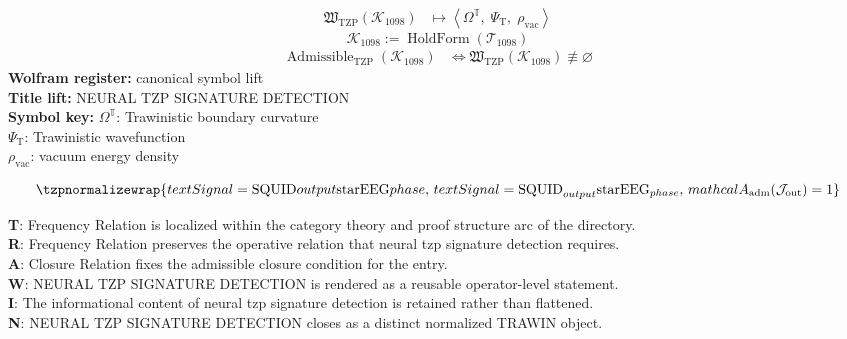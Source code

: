 \noindent
\begin{minipage}[t]{0.48\linewidth}
\begingroup
\small
\[
\begin{aligned}
\mathfrak{W}_{\mathrm{TZP}}\!\left(\mathcal{K}_{1098}\right)
&\longmapsto
\left\langle \Omega^{\mathbb{T}},\; \Psi_{\mathrm{T}},\; \rho_{\mathrm{vac}} \right\rangle
\end{aligned}
\]
\[
\mathcal{K}_{1098}
:=
\operatorname{HoldForm}\!\left(\mathcal{T}_{1098}\right)
\]
\[
\begin{aligned}
\operatorname{Admissible}_{\mathrm{TZP}}\!\left(\mathcal{K}_{1098}\right)
&\Longleftrightarrow
\mathfrak{W}_{\mathrm{TZP}}\!\left(\mathcal{K}_{1098}\right)\not\equiv\varnothing
\end{aligned}
\]
\textbf{Wolfram register:} canonical symbol lift\\
\textbf{Title lift:} NEURAL TZP SIGNATURE DETECTION\\
\textbf{Symbol key:} \(\Omega^{\mathbb{T}}\): Trawinistic boundary curvature\\ \(\Psi_{\mathrm{T}}\): Trawinistic wavefunction\\ \(\rho_{\mathrm{vac}}\): vacuum energy density
\par
\endgroup
\end{minipage}\hfill
\begin{minipage}[t]{0.48\linewidth}
\[
\tzpnormalizewrap{text{Signal} = \text{SQUID} {output} \mathrm{star} \text{EEG} {phase},\,text{Signal} = \text{SQUID}_{output} \mathrm{star} \text{EEG}_{phase},\,mathcal{A}_{\mathrm{adm}}\!\left(\mathcal{J}_{\mathrm{out}}\right)=1}
\]

\small
\textbf{T}: Frequency Relation is localized within the category theory and proof structure arc of the directory.\\
\textbf{R}: Frequency Relation preserves the operative relation that neural tzp signature detection requires.\\
\textbf{A}: Closure Relation fixes the admissible closure condition for the entry.\\
\textbf{W}: NEURAL TZP SIGNATURE DETECTION is rendered as a reusable operator-level statement.\\
\textbf{I}: The informational content of neural tzp signature detection is retained rather than flattened.\\
\textbf{N}: NEURAL TZP SIGNATURE DETECTION closes as a distinct normalized TRAWIN object.
\normalsize
\end{minipage}

